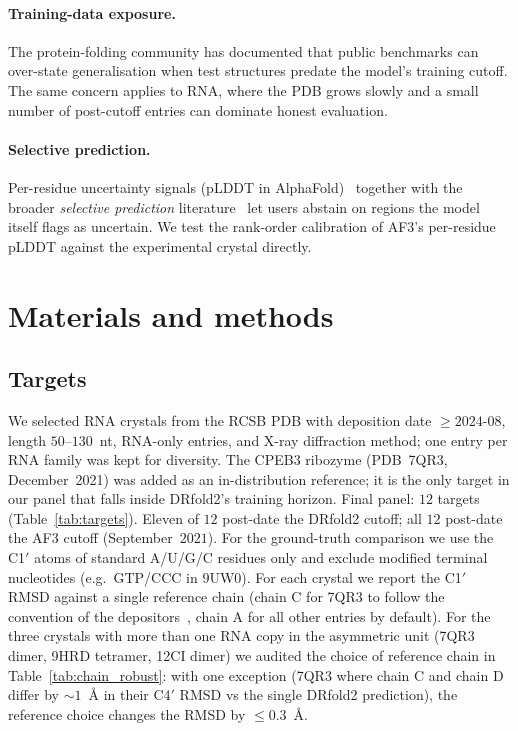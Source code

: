 \documentclass[11pt,a4paper]{article}
\begin{document}
\paragraph{Training-data exposure.} The protein-folding community has
documented that public benchmarks can over-state generalisation when
test structures predate the model's training cutoff. The same
concern applies to RNA, where the PDB grows slowly and a small
number of post-cutoff entries can dominate honest evaluation.

\paragraph{Selective prediction.} Per-residue uncertainty signals
(pLDDT in AlphaFold)~\cite{af3_2024} together with the broader
\emph{selective prediction} literature~\cite{elyaniv2010} let users
abstain on regions the model itself flags as uncertain. We test the
rank-order calibration of AF3's per-residue pLDDT against the
experimental crystal directly.

\section{Materials and methods}

\subsection{Targets}

We selected RNA crystals from the RCSB PDB with deposition date $\geq
2024$-$08$, length $50$--$130$~nt, RNA-only entries, and X-ray
diffraction method; one entry per RNA family was kept for diversity.
The CPEB3 ribozyme (PDB~7QR3, December~2021) was added as an
in-distribution reference; it is the only target in our panel that
falls inside DRfold2's training horizon. Final panel: $12$ targets
(Table~\ref{tab:targets}). Eleven of $12$ post-date the DRfold2
cutoff; all $12$ post-date the AF3 cutoff (September~$2021$).
For the ground-truth comparison we use the C1$'$ atoms of standard
A/U/G/C residues only and exclude modified terminal nucleotides
(e.g.~GTP/CCC in $9$UW$0$). For each crystal we report the C1$'$
RMSD against a single reference chain (chain C for 7QR3 to follow
the convention of the depositors~\cite{przytula2022}, chain A for
all other entries by default). For the three crystals with more
than one RNA copy in the asymmetric unit (7QR3 dimer, 9HRD tetramer,
12CI dimer) we audited the choice of reference chain in
Table~\ref{tab:chain_robust}: with one exception (7QR3 where chain C
and chain D differ by $\sim 1$~\AA{} in their C4$'$ RMSD vs the
single DRfold2 prediction), the reference choice changes the RMSD
by $\leq 0.3$~\AA{}.
\end{document}
